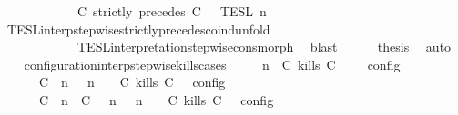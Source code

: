 \begin{isabellebody}
\ \ \ \ \ \ \ \ \ \ {\isacharequal}\ {\isasymlbrakk}{\isasymlbrakk}\ {\isacharparenleft}C\ strictly\ precedes\ C\ {\isacharhash}\ {\isasymPsi}\ {\isasymrbrakk}{\isasymrbrakk}\isactrlsub T\isactrlsub E\isactrlsub S\isactrlsub L\isactrlbsup {\isasymge}\ n\isactrlesup {\isacartoucheclose}\isanewline
\ \ \ \ \ \ \isamarkupfalse%
\ TESL{\isacharunderscore}interp{\isacharunderscore}stepwise{\isacharunderscore}strictly{\isacharunderscore}precedes{\isacharunderscore}coind{\isacharunderscore}unfold\isanewline
\ \ \ \ \ \ \ \ \ \ \ \ TESL{\isacharunderscore}interpretation{\isacharunderscore}stepwise{\isacharunderscore}cons{\isacharunderscore}morph\ \isamarkupfalse%
\ blast\isanewline
\ \ \ \ \isamarkupfalse%
\ {\isacharquery}thesis\ \isamarkupfalse%
\ auto\isanewline
\ \ \isamarkupfalse%
\isanewline
{}\isamarkupfalse%
%
\endisatagproof
{\isafoldproof}%
%
\isadelimproof
\isanewline
%
\endisadelimproof
\isanewline
{}\isamarkupfalse%
\ configuration{\isacharunderscore}interp{\isacharunderscore}stepwise{\isacharunderscore}kills{\isacharunderscore}cases{\isacharcolon}\isanewline
\ \ \ {\isacartoucheopen}{\isasymlbrakk}\ {\isasymGamma}{\isacharcomma}\ n\ {\isasymturnstile}\ {\isacharparenleft}{\isacharparenleft}C\ kills\ C\ {\isacharhash}\ {\isasymPsi}{\isacharparenright}\ {\isasymtriangleright}\ {\isasymPhi}\ {\isasymrbrakk}\isactrlsub c\isactrlsub o\isactrlsub n\isactrlsub f\isactrlsub i\isactrlsub g\isanewline
\ \ \ \ {\isacharequal}\ {\isasymlbrakk}\ {\isacharparenleft}{\isacharparenleft}C\ {\isasymnot}{\isasymUp}\ n{\isacharparenright}\ {\isacharhash}\ {\isasymGamma}{\isacharparenright}{\isacharcomma}\ n\ {\isasymturnstile}\ {\isasymPsi}\ {\isasymtriangleright}\ {\isacharparenleft}{\isacharparenleft}C\ kills\ C\ {\isacharhash}\ {\isasymPhi}{\isacharparenright}\ {\isasymrbrakk}\isactrlsub c\isactrlsub o\isactrlsub n\isactrlsub f\isactrlsub i\isactrlsub g\isanewline
\ \ \ \ {\isasymunion}\ {\isasymlbrakk}\ {\isacharparenleft}{\isacharparenleft}C\ {\isasymUp}\ n{\isacharparenright}\ {\isacharhash}\ {\isacharparenleft}C\ {\isasymnot}{\isasymUp}\ {\isasymge}\ n{\isacharparenright}\ {\isacharhash}\ {\isasymGamma}{\isacharparenright}{\isacharcomma}\ n\ {\isasymturnstile}\ {\isasymPsi}\ {\isasymtriangleright}\ {\isacharparenleft}{\isacharparenleft}C\ kills\ C\ {\isacharhash}\ {\isasymPhi}{\isacharparenright}\ {\isasymrbrakk}\isactrlsub c\isactrlsub o\isactrlsub n\isactrlsub f\isactrlsub i\isactrlsub g{\isacartoucheclose}\isanewline

\end{isabellebody}
